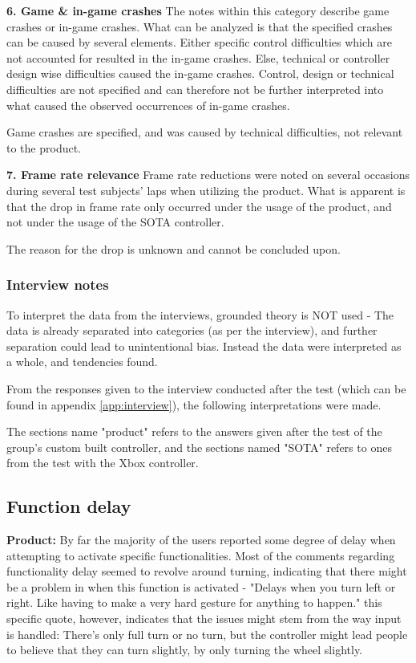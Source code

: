 \noindent\textbf{6. Game \& in-game crashes}\newline
The notes within this category describe game crashes or in-game crashes. What can be analyzed is that the specified crashes can be caused by several elements.
Either specific control difficulties which are not accounted for resulted in the in-game crashes. 
Else, technical or controller design wise difficulties caused the in-game crashes. Control, design or technical difficulties are not specified and can therefore not be further interpreted into what caused the observed occurrences of in-game crashes.

Game crashes are specified, and was caused by technical difficulties, not relevant to the product.
\bigskip

\noindent\textbf{7. Frame rate relevance}\newline
Frame rate reductions were noted on several occasions during several test subjects’ laps when utilizing the product. 
What is apparent is that the drop in frame rate only occurred under the usage of the product, and not under the usage of the SOTA controller.

The reason for the drop is unknown and cannot be concluded upon.

\subsubsection{Interview notes}
To interpret the data from the interviews, grounded theory is NOT used - The data is already separated into categories (as per the interview), and further separation could lead to unintentional bias. 
Instead the data were interpreted as a whole, and tendencies found.

From the responses given to the interview conducted after the test (which can be found in appendix \ref{app:interview}), the following interpretations were made.

The sections name "product" refers to the answers given after the test of the group's custom built controller, and the sections named "SOTA" refers to ones from the test with the Xbox controller.

\subsection*{Function delay}
\noindent\textbf{Product: }\newline
By far the majority of the users reported some degree of delay when attempting to activate specific functionalities. Most of the comments regarding functionality delay seemed to revolve around turning, indicating that there might be a problem in when this function is activated - "Delays when you turn left or right. Like having to make a very hard gesture for anything to happen." this specific quote, however, indicates that the issues might stem from the way input is handled: There's only full turn or no turn, but the controller might lead people to believe that they can turn slightly, by only turning the wheel slightly.
\bigskip

